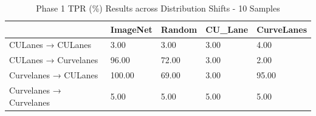 \begin{table}
\caption{Phase 1 TPR (\%) Results across Distribution Shifts - 10 Samples}
\label{tab:phase1_tpr_10}
\begin{tabular}{lllll}
\toprule
 & ImageNet & Random & CU_Lane & CurveLanes \\
\midrule
CULanes → CULanes & 3.00 & 3.00 & 3.00 & 4.00 \\
CULanes → Curvelanes & 96.00 & 72.00 & 3.00 & 2.00 \\
Curvelanes → CULanes & 100.00 & 69.00 & 3.00 & 95.00 \\
Curvelanes → Curvelanes & 5.00 & 5.00 & 5.00 & 5.00 \\
\bottomrule
\end{tabular}
\end{table}
